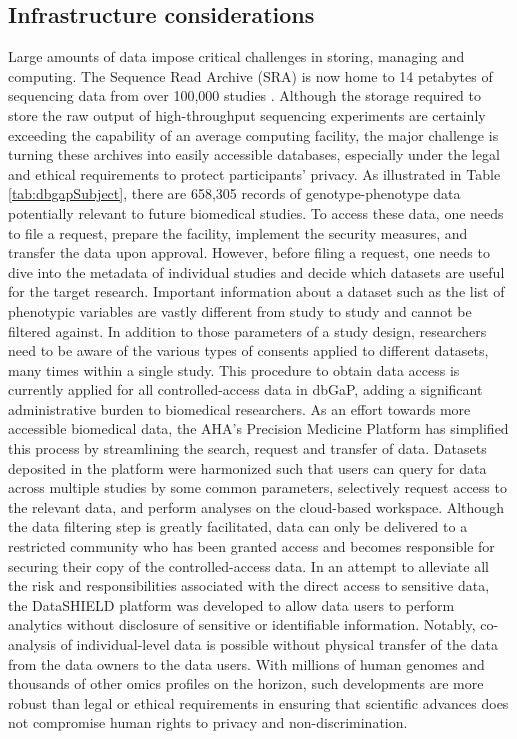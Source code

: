 \documentclass[letter]{bioinfo}
\begin{document}
	
	\subsection*{Infrastructure considerations}
	Large amounts of data impose critical challenges in storing, managing and computing. The Sequence Read Archive (SRA) \citep{Leinonen:2011:Sequence} is now home to 14 petabytes of sequencing data from over 100,000 studies \citep{Langmead:2018:Cloud}.
	Although the storage required to store the raw output of high-throughput sequencing experiments are certainly exceeding the capability of an average computing facility, the major challenge is turning these archives into easily accessible databases, especially under the legal and ethical requirements to protect participants' privacy.
	As illustrated in Table \ref{tab:dbgapSubject}, there are 658,305 records of genotype-phenotype data potentially relevant to future biomedical studies. To access these data, one needs to file a request, prepare the facility, implement the security measures, and transfer the data upon approval. However, before filing a request, one needs to dive into the metadata of individual studies and decide which datasets are useful for the target research. Important information about a dataset such as the list of phenotypic variables are vastly different from study to study and cannot be filtered against. In addition to those parameters of a study design, researchers need to be aware of the various types of consents applied to different datasets, many times within a single study. This procedure to obtain data access is currently applied for all controlled-access data in dbGaP, adding a significant administrative burden to biomedical researchers.
	As an effort towards more accessible biomedical data, the AHA's Precision Medicine Platform \citep{Kass-Hout:2018:American} has simplified this process by streamlining the search, request and transfer of data. Datasets deposited in the platform were harmonized such that users can query for data across multiple studies by some common parameters, selectively request access to the relevant data, and perform analyses on the cloud-based workspace.
	Although the data filtering step is greatly facilitated, data can only be delivered to a restricted community who has been granted access and becomes responsible for securing their copy of the controlled-access data. In an attempt to alleviate all the risk and responsibilities associated with the direct access to sensitive data, the DataSHIELD platform was developed \citep{Gaye:2014:DataSHIELD, Wilson:2017:DataSHIELD} to allow data users to perform analytics without disclosure of sensitive or identifiable information. Notably, co-analysis of individual-level data is possible without physical transfer of the data from the data owners to the data users. With millions of human genomes and thousands of other omics profiles on the horizon, such developments are more robust than legal or ethical requirements in ensuring that scientific advances does not compromise human rights to privacy and non-discrimination.
\end{document}
